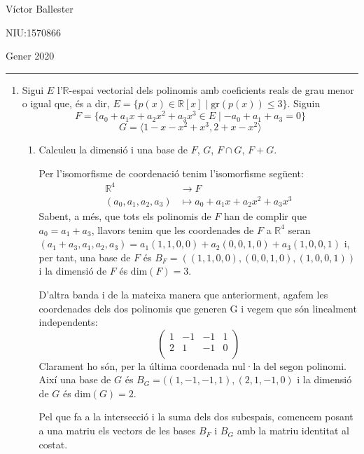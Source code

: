 \documentclass[11pt,a4paper]{article}
\begin{document}
\begin{flushright}
    Víctor Ballester\par NIU:1570866\par Gener 2020
\end{flushright}
\rule{180mm}{0.1mm}
\begin{enumerate}
    \item Sigui $E$ l’$\mathbb{R}$-espai vectorial dels polinomis amb coeficients reals de grau menor o igual que, és a dir, $E=\{p(x)\in \mathbb{R}[x]\mid \text{gr}(p(x))\leq 3\}$. Siguin $$F=\{a_0+a_1x+a_2x^2+a_3x^3\in E\mid -a_0+a_1+a_3=0\}$$ $$G=\langle 1-x-x^2+x^3,2+x-x^2\rangle$$
    \begin{enumerate}
        \item Calculeu la dimensió i una base de $F$, $G$, $F\cap G$, $F+G$.\par 
        Per l'isomorfisme de coordenació tenim l'isomorfisme següent:
        \begin{align*}
            \mathbb{R}^4&\longrightarrow F\\
            (a_0,a_1,a_2,a_3)&\longmapsto a_0+a_1x+a_2x^2+a_3x^3
        \end{align*}
        Sabent, a més, que tots els polinomis de $F$ han de complir que $a_0=a_1+a_3$, llavors tenim que les coordenades de $F$ a $\mathbb{R}^4$ seran $(a_1+a_3,a_1,a_2,a_3)=a_1(1,1,0,0)+a_2(0,0,1,0)+a_3(1,0,0,1)$ i, per tant, una base de $F$ és $B_F=((1,1,0,0),(0,0,1,0),(1,0,0,1))$ i la dimensió de $F$ és $\text{dim}(F)=3$.\par 
        D'altra banda i de la mateixa manera que anteriorment, agafem les coordenades dels dos polinomis que generen G i vegem que són linealment independents:
        \begin{equation*}
            \begin{pmatrix}
              1 & -1 & -1 & 1 \\
              2 & 1 & -1 & 0 \\
           \end{pmatrix}
        \end{equation*}
        Clarament ho són, per la última coordenada nul·la del segon polinomi. Així una base de $G$ és $B_G=((1,-1,-1,1),(2,1,-1,0)$ i la dimensió de $G$ és $\text{dim}(G)=2$.\par 
        Pel que fa a la intersecció i la suma dels dos subespais, comencem posant a una matriu els vectors de les bases $B_F$ i $B_G$ amb la matriu identitat al costat.
        \begin{multline*}

\end{multline*}
\end{enumerate}
\end{enumerate}
\end{document}
